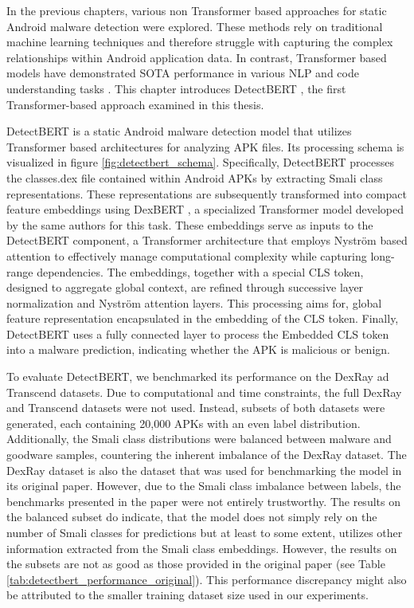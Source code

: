 In the previous chapters, various non Transformer based approaches for 
static Android malware detection were explored. 
These methods rely on traditional machine learning techniques and therefore  
struggle with capturing the complex relationships within Android application data. 
In contrast, Transformer based models have demonstrated SOTA 
performance in various NLP and code understanding tasks \cite{transformer_sota}. 
This chapter introduces DetectBERT \cite{detectbert}, the first Transformer-based approach examined 
in this thesis.

DetectBERT is a static Android malware detection model that utilizes Transformer based architectures for analyzing APK files.
Its processing schema is visualized in figure \ref{fig:detectbert_schema}.
Specifically, DetectBERT processes the classes.dex file contained within Android APKs by extracting Smali class representations. 
These representations are subsequently transformed into compact feature embeddings using DexBERT \cite{dexbert}, 
a specialized Transformer model developed by the same authors for this task.
These embeddings serve as inputs to the DetectBERT component, a Transformer architecture that employs Nyström based attention \cite{nystromformer} 
to effectively manage computational complexity while capturing long-range dependencies. 
The embeddings, together with a special CLS token, designed to aggregate global context, are refined through successive layer normalization and Nyström attention layers. 
This processing aims for, global feature representation encapsulated in the embedding of the CLS token.
Finally, DetectBERT uses a fully connected  layer to process the Embedded CLS token into a  malware prediction, indicating whether the APK is malicious or benign.

To evaluate DetectBERT, we benchmarked its performance on the DexRay ad Transcend datasets. 
Due to computational and time constraints, the full DexRay and Transcend datasets were not used. 
Instead, subsets of both datasets were generated, each containing 20,000 APKs with an even label distribution. 
Additionally, the Smali class distributions were balanced between malware and 
goodware samples, countering the inherent imbalance of the DexRay dataset. 
The DexRay dataset is also the dataset that was used for benchmarking the model 
in its original paper. However, due to the Smali class imbalance between labels, 
the benchmarks presented in the paper were not entirely trustworthy. 
The results on the balanced subset do indicate, that the model does not simply rely 
on the number of Smali classes for predictions but at least to some extent, 
utilizes other information extracted from the Smali class embeddings. 
However, the results on the subsets are not as good as those provided in the 
original paper (see Table \ref{tab:detectbert_performance_original}). 
This performance discrepancy might also be attributed 
to the smaller training dataset size used in our experiments.

